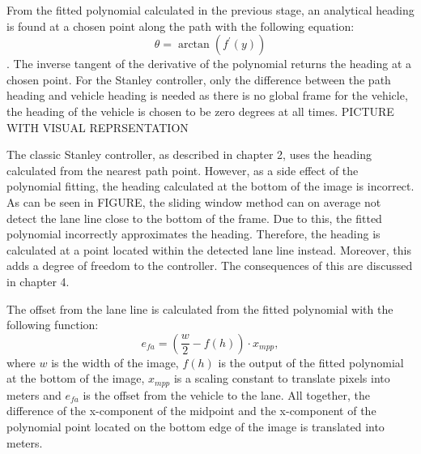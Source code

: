 \documentclass[arbeit=studie,oneside,BCOR=12mm]{ArbeitRST}
\begin{document}
From the fitted polynomial calculated in the previous stage, an analytical
heading is found at a chosen point along the path with the following equation:
$$\theta = \arctan(f^\prime(y))$$. The inverse tangent of the derivative of
the polynomial returns the heading at a chosen point. For the Stanley
controller, only the difference between the path heading and vehicle heading
is needed as there is no global frame for the vehicle, the heading
of the vehicle is chosen to be zero degrees at all times. PICTURE WITH VISUAL
REPRSENTATION 

The classic Stanley controller, as described in chapter 2, uses the heading
calculated from the nearest path point. However, as a side effect of the
polynomial fitting, the heading calculated at the bottom of the image is
incorrect. As can be seen in FIGURE, the sliding window method can on average
not detect the lane line close to the bottom of the frame. Due to this, the
fitted polynomial incorrectly approximates the heading. Therefore, the heading
is calculated at a point located within the detected lane line instead.
Moreover, this adds a degree of freedom to the controller. The consequences of
this are discussed in chapter 4.


The offset from the lane line is calculated from the fitted polynomial with
the following function: $$e_{fa} = (\frac{w}{2} - f(h))\cdot x_{mpp},$$ where
$w$ is the width of the image, $f(h)$ is the output of the fitted polynomial
at the bottom of the image, $x_{mpp}$ is a scaling constant to translate
pixels into meters and $e_{fa}$ is the offset from the vehicle to the lane.
All together, the difference of the x-component of the midpoint and the
x-component of the polynomial point located on the bottom edge of the image is
translated into meters.
\end{document}
